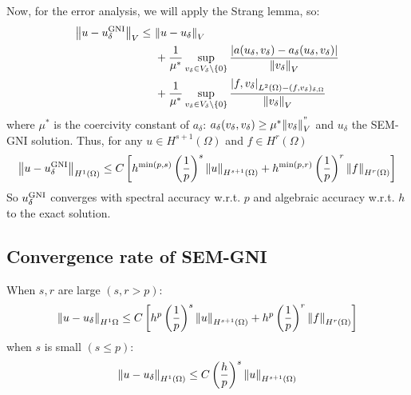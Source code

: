 Now, for the error analysis, we will apply the Strang lemma, so:
\begin{align*}
    \norm{u- u _\delta^{\text{GNI}}}_V \leq \ & \norm{u-u_\delta}_V \\
    & + \frac{1}{\mu^*} \sup_{v_\delta \in V_\delta \backslash\left\{ 0 \right\}} \frac{\abs{a(u_\delta, v_\delta) - a_\delta(u_\delta, v_\delta)}}{\norm{v_\delta}_V} \\
    & + \frac{1}{\mu^*} \sup_{v_\delta \in V_\delta \backslash\left\{ 0 \right\}} \frac{\abs{f,v_\delta}_{L^2(\Omega) - (f,v_\delta)_{\delta,\Omega}}}{\norm{v_\delta}_V}
\end{align*}
where \(\mu^*\) is the coercivity constant of \(a_\delta\): \(a_\delta(v_\delta, v_\delta) \geq \mu^*\norm{v_\delta}^"_V\) and \(u_\delta\) the SEM-GNI solution.
Thus, for any \(u \in H^{s+1}(\Omega)\) and \(f \in H^r(\Omega)\) 
\[
    \norm{u-u_\delta^{\text{GNI}}}_{H^1(\Omega)} \leq C\left[ h^{\min(p,s)}\left( \frac{1}{p} \right)^s \norm{u}_{H^{s+1}(\Omega)} + h^{\min(p,r)}\left( \frac{1}{p} \right)^r \norm{f}_{H^{r}(\Omega)}  \right]
\]
So \(u_\delta^{\text{GNI}}\) converges with spectral accuracy w.r.t. \(p\) and algebraic accuracy w.r.t. \(h\) to the exact solution.
\subsection{Convergence rate of SEM-GNI}
When \(s,r\) are large \((s, r > p)\):
\[
    \norm{u-u_\delta}_{H^1{\Omega}} \leq C \left[ h^p \left(\frac{1}{p}\right)^s \norm{u}_{H^{s+1}(\Omega)} + h^p \left(\frac{1}{p}\right)^r \norm{f}_{H^{r}(\Omega)}  \right]
\]
when \(s\) is small \((s \leq p)\):
\[
    \norm{u-u_\delta}_{H^1(\Omega)} \leq C\left( \frac{h}{p} \right)^s \norm{u}_{H^{s+1}(\Omega)}
\]
